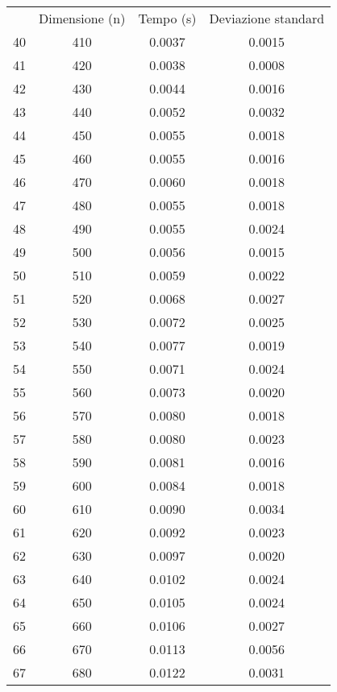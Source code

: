 \begin{table}
\centering
\begin{adjustbox}{width=1\textwidth/2}
\begin{tabular}{|c|c|c|c|}
\hline
 & Dimensione (n) & Tempo (s) & Deviazione standard \\
40 & 410 & 0.0037 & 0.0015 \\
\cline{1-4}
41 & 420 & 0.0038 & 0.0008 \\
\cline{1-4}
42 & 430 & 0.0044 & 0.0016 \\
\cline{1-4}
43 & 440 & 0.0052 & 0.0032 \\
\cline{1-4}
44 & 450 & 0.0055 & 0.0018 \\
\cline{1-4}
45 & 460 & 0.0055 & 0.0016 \\
\cline{1-4}
46 & 470 & 0.0060 & 0.0018 \\
\cline{1-4}
47 & 480 & 0.0055 & 0.0018 \\
\cline{1-4}
48 & 490 & 0.0055 & 0.0024 \\
\cline{1-4}
49 & 500 & 0.0056 & 0.0015 \\
\cline{1-4}
50 & 510 & 0.0059 & 0.0022 \\
\cline{1-4}
51 & 520 & 0.0068 & 0.0027 \\
\cline{1-4}
52 & 530 & 0.0072 & 0.0025 \\
\cline{1-4}
53 & 540 & 0.0077 & 0.0019 \\
\cline{1-4}
54 & 550 & 0.0071 & 0.0024 \\
\cline{1-4}
55 & 560 & 0.0073 & 0.0020 \\
\cline{1-4}
56 & 570 & 0.0080 & 0.0018 \\
\cline{1-4}
57 & 580 & 0.0080 & 0.0023 \\
\cline{1-4}
58 & 590 & 0.0081 & 0.0016 \\
\cline{1-4}
59 & 600 & 0.0084 & 0.0018 \\
\cline{1-4}
60 & 610 & 0.0090 & 0.0034 \\
\cline{1-4}
61 & 620 & 0.0092 & 0.0023 \\
\cline{1-4}
62 & 630 & 0.0097 & 0.0020 \\
\cline{1-4}
63 & 640 & 0.0102 & 0.0024 \\
\cline{1-4}
64 & 650 & 0.0105 & 0.0024 \\
\cline{1-4}
65 & 660 & 0.0106 & 0.0027 \\
\cline{1-4}
66 & 670 & 0.0113 & 0.0056 \\
\cline{1-4}
67 & 680 & 0.0122 & 0.0031 \\
\cline{1-4}

\end{tabular}
\end{adjustbox}
\end{table}
